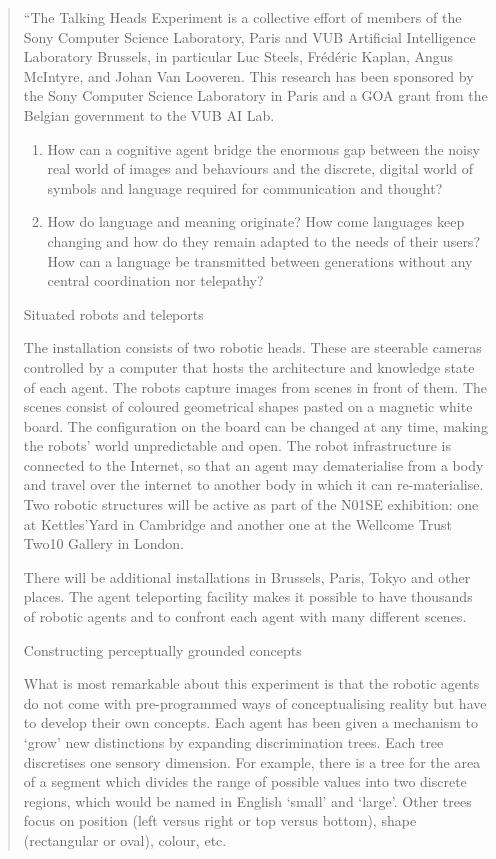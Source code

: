 \begin{quotation}
``The Talking Heads Experiment is a collective effort of members of the Sony Computer Science Laboratory, Paris
and VUB Artificial Intelligence Laboratory Brussels, in particular Luc Steels, Fr\'{e}d\'{e}ric Kaplan, Angus McIntyre, 
and Johan Van Looveren. This research has been sponsored by the Sony Computer Science Laboratory in Paris and a 
GOA grant from the Belgian government to the VUB AI Lab.

\begin{enumerate}
\item How can a cognitive agent bridge the enormous gap between the noisy real world of images and behaviours and 
the discrete, digital world of symbols and language required for communication and thought? 
\item How do language and meaning originate? How come languages keep changing and how do they remain adapted to 
the needs of their users? How can a language be transmitted between generations without any central coordination 
nor telepathy?
\end{enumerate}

\noindent
{\bfshape Situated robots and teleports}

\noindent
The installation consists of two robotic heads. These are steerable cameras controlled by a computer that hosts the 
architecture and knowledge state of each agent. The robots capture images from scenes in front of them. The scenes consist 
of coloured geometrical shapes pasted on a magnetic white board. The configuration on the board can be changed at any 
time, making the robots' world unpredictable and open. The robot infrastructure is connected to the Internet, so 
that an agent may dematerialise from a body and travel over the internet to another body in which it can re-materialise.
Two robotic structures will be active as part of the N01SE exhibition: one at Kettles'Yard in Cambridge and another 
one at the Wellcome Trust Two10 Gallery in London. 

There will be additional installations in Brussels, Paris, Tokyo and other places. The agent teleporting facility 
makes it possible to have thousands of robotic agents and to confront each agent with many different scenes. 

\noindent
{\bfshape Constructing perceptually grounded concepts}

\noindent
What is most remarkable about this experiment is that the robotic agents do not come with 
pre-programmed ways of conceptualising reality but have to develop their own concepts. Each agent has been 
given a mechanism to `grow' new distinctions by expanding discrimination trees. Each tree discretises one sensory 
dimension. For example, there is a tree for the area of a segment which divides the range of possible values
into two discrete regions, which would be named in English `small' and `large'. Other trees focus on position 
(left versus right or top versus bottom), shape (rectangular or oval), colour, etc. 


\end{quotation}
